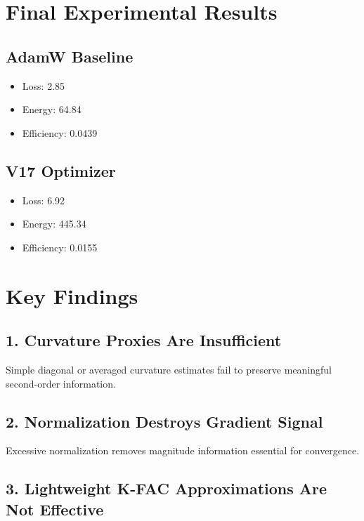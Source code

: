 \documentclass{article}
\begin{document}
\section{Final Experimental Results}

\subsection{AdamW Baseline}

\begin{itemize}
    \item Loss: 2.85
    \item Energy: 64.84
    \item Efficiency: 0.0439
\end{itemize}

\subsection{V17 Optimizer}

\begin{itemize}
    \item Loss: 6.92
    \item Energy: 445.34
    \item Efficiency: 0.0155
\end{itemize}

\section{Key Findings}

\subsection{1. Curvature Proxies Are Insufficient}

Simple diagonal or averaged curvature estimates fail to preserve meaningful second-order information.

\subsection{2. Normalization Destroys Gradient Signal}

Excessive normalization removes magnitude information essential for convergence.

\subsection{3. Lightweight K-FAC Approximations Are Not Effective}
\end{document}
